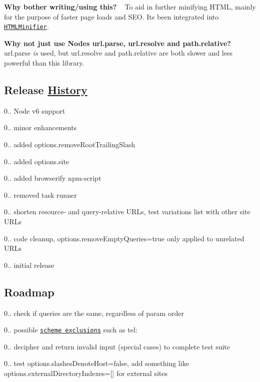 \begin{DoxyEnumerate}
\item {\bfseries Why bother writing/using this?} ~\newline
To aid in further minifying H\+T\+ML, mainly for the purpose of faster page loads and S\+EO. It\textquotesingle{}s been integrated into \href{https://github.com/kangax/html-minifier}{\tt H\+T\+M\+L\+Minifier}.
\item {\bfseries Why not just use Node\textquotesingle{}s {\ttfamily url.\+parse}, {\ttfamily url.\+resolve} and {\ttfamily path.\+relative}?} ~\newline
{\ttfamily url.\+parse} {\itshape is} used, but {\ttfamily url.\+resolve} and {\ttfamily path.\+relative} are both slower and less powerful than this library.
\end{DoxyEnumerate}

\subsection*{Release \mbox{\hyperlink{interface_history}{History}}}


\begin{DoxyItemize}
\item 0.. Node v6 support
\item 0.. minor enhancements
\item 0.. added {\ttfamily options.\+remove\+Root\+Trailing\+Slash}
\item 0.. added {\ttfamily options.\+site}
\item 0.. added browserify npm-\/script
\item 0.. removed task runner
\item 0.. shorten resource-\/ and query-\/relative U\+R\+Ls, test variations list with other site U\+R\+Ls
\item 0.. code cleanup, {\ttfamily options.\+remove\+Empty\+Queries=true} only applied to unrelated U\+R\+Ls
\item 0.. initial release
\end{DoxyItemize}

\subsection*{Roadmap}


\begin{DoxyItemize}
\item 0.. check if queries are the same, regardless of param order
\item 0.. possible \href{http://www.iana.org/assignments/uri-schemes/uri-schemes.xhtml}{\tt scheme exclusions} such as {\ttfamily tel\+:}
\item 0.. decipher and return invalid input (special cases) to complete test suite
\item 0.. test {\ttfamily options.\+slashes\+Denote\+Host=false}, add something like {\ttfamily options.\+external\+Directory\+Indexes=\mbox{[}\mbox{]}} for external sites 
\end{DoxyItemize}